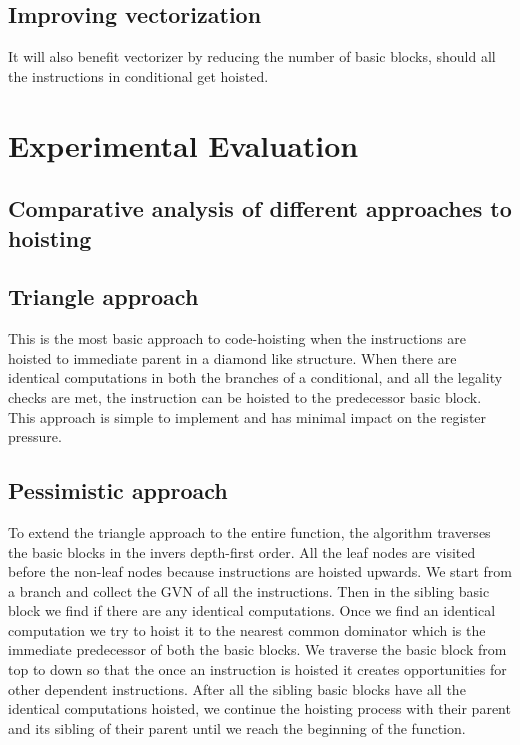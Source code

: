 \documentclass{sig-alternate}
\begin{document}
\subsection{Improving vectorization}
It will also benefit vectorizer by reducing the number
of basic blocks, should all the instructions in conditional get hoisted.


\section{Experimental Evaluation}
\label{sec:experimental-results}

\subsection{Comparative analysis of different approaches to hoisting}
\subsection{Triangle approach}
This is the most basic approach to code-hoisting when the instructions are
hoisted to immediate parent in a diamond like structure. When there are
identical computations in both the branches of a conditional, and all the
legality checks are met, the instruction can be hoisted to the predecessor basic
block. This approach is simple to implement and has minimal impact on the
register pressure.

\subsection{Pessimistic approach}
To extend the triangle approach to the entire function, the algorithm traverses
the basic blocks in the invers depth-first order. All the leaf nodes are visited
before the non-leaf nodes because instructions are hoisted upwards. We start
from a branch and collect the GVN of all the instructions. Then in the sibling
basic block we find if there are any identical computations. Once we find an
identical computation we try to hoist it to the nearest common dominator which
is the immediate predecessor of both the basic blocks. We traverse the basic
block from top to down so that the once an instruction is hoisted it creates
opportunities for other dependent instructions. After all the sibling basic
blocks have all the identical computations hoisted, we continue the hoisting
process with their parent and its sibling of their parent until we reach the
beginning of the function.
\end{document}
